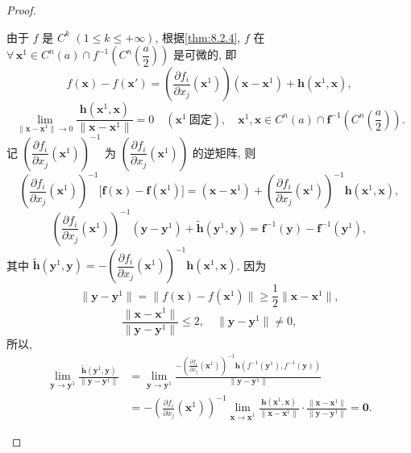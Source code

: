 \begin{proof}
\begin{enumerate}
由于 $f$ 是 $C^{k}$ $(1 \leqslant k \leqslant +\infty)$, 根据\cref{thm:8.2.4}, $f$ 在 $\forall\,\boldsymbol{x}^{1} \in C^{n}(a) \cap f^{-1}\left(C^{n}\left(\dfrac{a}{2}\right)\right)$ 是可微的, 即
\[
  f(\boldsymbol{x}) - f(\boldsymbol{x}') = \left(\frac{\partial f_{i}}{\partial x_{j}}(\boldsymbol{x}^{1})\right)(\boldsymbol{x} - \boldsymbol{x}^{1}) + \boldsymbol{h}(\boldsymbol{x}^{1}, \boldsymbol{x}),
\]
\[
  \lim_{\|\boldsymbol{x} - \boldsymbol{x}^{1}\| \to 0}\frac{\boldsymbol{h}(\boldsymbol{x}^{1}, \boldsymbol{x})}{\|\boldsymbol{x} - \boldsymbol{x}^{1}\|} = 0
  \quad (\boldsymbol{x}^{1}\ \text{固定}), \quad \boldsymbol{x}^{1}, \boldsymbol{x} \in C^{n}(a) \cap \boldsymbol{f}^{-1}\left(C^{n}\left(\frac{a}{2}\right)\right).
\]
记 $\left(\dfrac{\partial f_{i}}{\partial x_{j}}(\boldsymbol{x}^{1})\right)^{-1}$ 为 $\left(\dfrac{\partial f_{i}}{\partial x_{j}}(\boldsymbol{x}^{1})\right)$ 的逆矩阵, 则
\[
  \left(\frac{\partial f_{i}}{\partial x_{j}}(\boldsymbol{x}^{1})\right)^{-1}\bigl[\boldsymbol{f}(\boldsymbol{x}) - \boldsymbol{f}(\boldsymbol{x}^{1})\bigr] = (\boldsymbol{x} - \boldsymbol{x}^{1}) + \left(\frac{\partial f_{i}}{\partial x_{j}}(\boldsymbol{x}^{1})\right)^{-1}\boldsymbol{h}(\boldsymbol{x}^{1}, \boldsymbol{x}),
\]
\[
  \left(\frac{\partial f_{i}}{\partial x_{j}}(\boldsymbol{x}^{1})\right)^{-1}(\boldsymbol{y} - \boldsymbol{y}^{1}) + \tilde{\boldsymbol{h}}(\boldsymbol{y}^{1}, \boldsymbol{y}) = \boldsymbol{f}^{-1}(\boldsymbol{y}) - \boldsymbol{f}^{-1}(\boldsymbol{y}^{1}),
\]
其中 $\tilde{\boldsymbol{h}}(\boldsymbol{y}^{1}, \boldsymbol{y}) = -\left(\dfrac{\partial f_{i}}{\partial x_{j}}(\boldsymbol{x}^{1})\right)^{-1}\boldsymbol{h}(\boldsymbol{x}^{1}, \boldsymbol{x})$. 因为
\[
  \|\boldsymbol{y} - \boldsymbol{y}^{1}\| = \|f(\boldsymbol{x}) - f(\boldsymbol{x}^{1})\| \geqslant \frac{1}{2}\|\boldsymbol{x} - \boldsymbol{x}^{1}\|,
\]
\[
  \frac{\|\boldsymbol{x} - \boldsymbol{x}^{1}\|}{\|\boldsymbol{y} - \boldsymbol{y}^{1}\|} \leqslant 2, \quad \|\boldsymbol{y} - \boldsymbol{y}^{1}\| \neq 0,
\]
所以,
\begin{align*}
  \lim_{\boldsymbol{y} \to \boldsymbol{y}^{1}}\frac{\tilde{\boldsymbol{h}}(\boldsymbol{y}^{1}, \boldsymbol{y})}{\|\boldsymbol{y} - \boldsymbol{y}^{1}\|} &= \lim_{\boldsymbol{y} \to \boldsymbol{y}^{1}}\frac{-\left(\frac{\partial f_{i}}{\partial x_{j}}(\boldsymbol{x}^{1})\right)^{-1}\boldsymbol{h}(f^{-1}(\boldsymbol{y}^{1}), f^{-1}(\boldsymbol{y}))}{\|\boldsymbol{y} - \boldsymbol{y}^{1}\|} \\
  &= -\left(\frac{\partial f_{i}}{\partial x_{j}}(\boldsymbol{x}^{1})\right)^{-1}\lim_{\boldsymbol{x} \to \boldsymbol{x}^{1}}\frac{\boldsymbol{h}(\boldsymbol{x}^{1}, \boldsymbol{x})}{\|\boldsymbol{x} - \boldsymbol{x}^{1}\|} \cdot \frac{\|\boldsymbol{x} - \boldsymbol{x}^{1}\|}{\|\boldsymbol{y} - \boldsymbol{y}^{1}\|} = \boldsymbol{0}.

\end{align*}
\end{enumerate}
\end{proof}
